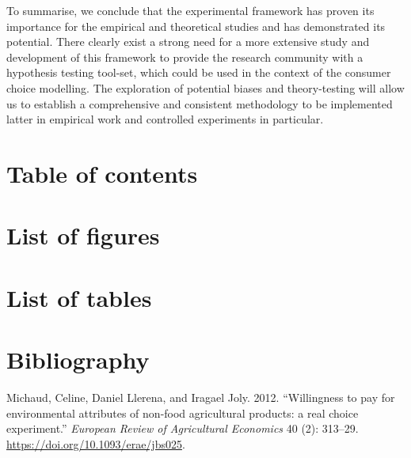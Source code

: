 \documentclass[11pt,]{article}
\begin{document}
To summarise, we conclude that the experimental framework has proven its
importance for the empirical and theoretical studies and has
demonstrated its potential. There clearly exist a strong need for a more
extensive study and development of this framework to provide the
research community with a hypothesis testing tool-set, which could be
used in the context of the consumer choice modelling. The exploration of
potential biases and theory-testing will allow us to establish a
comprehensive and consistent methodology to be implemented latter in
empirical work and controlled experiments in particular.

\newpage
\renewcommand\contentsname{}
\setcounter{tocdepth}{4}

\hypertarget{table-of-contents}{%
\section*{Table of contents}\label{table-of-contents}}

\vspace{-12mm}
\tableofcontents

\newpage

\hypertarget{list-of-figures}{%
\section*{List of figures}\label{list-of-figures}}

\renewcommand\listfigurename{}
\vspace{-12mm}
\listoffigures

\newpage

\hypertarget{list-of-tables}{%
\section*{List of tables}\label{list-of-tables}}

\renewcommand\listtablename{}
\vspace{-12mm}
\listoftables

\newpage

\hypertarget{bibliography}{%
\section*{Bibliography}\label{bibliography}}

\hypertarget{refs}{}
\leavevmode\hypertarget{ref-llerena2013rose}{}%
Michaud, Celine, Daniel Llerena, and Iragael Joly. 2012. ``Willingness
to pay for environmental attributes of non-food agricultural products: a
real choice experiment.'' \emph{European Review of Agricultural
Economics} 40 (2): 313--29. \url{https://doi.org/10.1093/erae/jbs025}.
\end{document}
